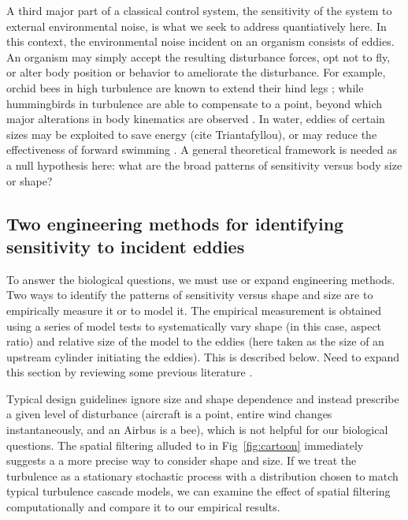 \documentclass{jfm}
\begin{document}
A third major part of a classical control system, the sensitivity of the system to external environmental noise, is what we seek to address quantiatively here.  In this context, the environmental noise incident on an organism consists of eddies.  An organism may simply accept the resulting disturbance forces, opt not to fly, or alter body position or behavior to ameliorate the disturbance.  For example, orchid bees in high turbulence are known to extend their hind legs \citep{Combes:2009}; while hummingbirds in turbulence are able to compensate to a point, beyond which major alterations in body kinematics are observed \citep{Ortega:2012x}.  In water, eddies of certain sizes may be exploited to save energy (cite Triantafyllou), or may reduce the effectiveness of forward swimming \citep{Webb:2010}.  A general theoretical framework is needed as a null hypothesis here: what are the broad patterns of sensitivity versus body size or shape?  

\subsection{Two engineering methods for identifying sensitivity to incident eddies}
To answer the biological questions, we must use or expand engineering methods.  Two ways to identify the patterns of sensitivity versus shape and size are to empirically measure it or to model it.  The empirical measurement is obtained using a series of model tests to systematically vary shape (in this case, aspect ratio) and relative size of the model to the eddies (here taken as the size of an upstream cylinder initiating the eddies). This is described below.  Need to expand this section by reviewing some previous literature  \citep{Fox:2010, Marmarelis:1977, Marmarelis:1993}.


Typical design guidelines \citep{navair:1996} ignore size and shape dependence and instead prescribe a given level of disturbance (aircraft is a point, entire wind changes instantaneously, and an Airbus is a bee), which is not helpful for our biological questions. The spatial filtering alluded to in Fig~\ref{fig:cartoon} immediately suggests a a more precise way to consider shape and size. If we treat the turbulence as a stationary stochastic process with a distribution chosen to match typical turbulence cascade models, we can examine the effect of spatial filtering computationally and compare it to our empirical results. 
\end{document}
